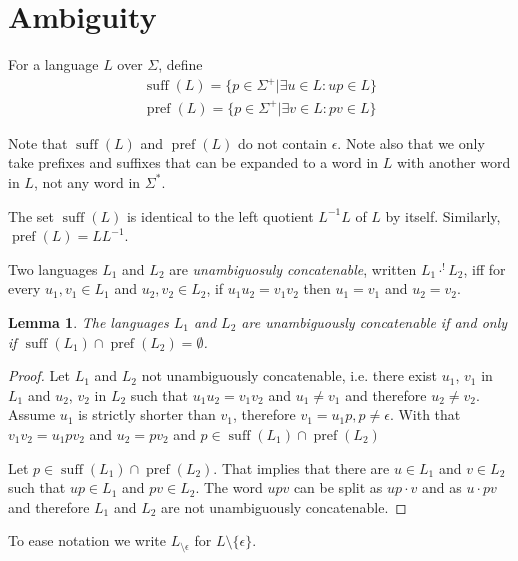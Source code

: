 \documentclass{amsart}
\newcommand{\ensmath}[1]{\ensuremath{#1}\xspace}
\newcommand{\suff}{\ensmath{\operatorname{suff}}}
\newcommand{\pref}{\ensmath{\operatorname{pref}}}
\newcommand{\eps}{\ensmath{\epsilon}}
\newcommand{\conc}[2]{\ensmath{#1\cdot #2}}
\newcommand{\uaconc}[2]{\ensmath{#1\cdot^{!} #2}}
\newcommand{\noeps}[1]{\ensmath{{#1}_{\setminus \epsilon}}}
\newtheorem{lemma}[theorem]{Lemma}
{\theoremstyle{definition} 
  \newtheorem{defn}{Definition}
  \newtheorem*{remark}{Remark}
  \newtheorem*{example}{Example}}
\begin{document}
\section*{Ambiguity}

\begin{defn}
  For a language $L$ over $\Sigma$, define
  \begin{equation*}
    \begin{split}
      \suff(L) = \{ p \in \Sigma^+ | \exists u \in L: up \in L \}\\
      \pref(L) = \{ p \in \Sigma^+ | \exists v \in L: pv \in L \}
    \end{split}
  \end{equation*}
\end{defn}
Note that $\suff(L)$ and $\pref(L)$ do not contain $\eps$. Note also that
we only take prefixes and suffixes that can be expanded to a word in $L$
with another word in $L$, not any word in $\Sigma^*$.

The set $\suff(L)$ is identical to the left quotient $L^{-1}L$ of $L$ by
itself. Similarly, $\pref(L) = LL^{-1}$.

\begin{defn}
Two languages $L_1$ and $L_2$ are \emph{unambiguosuly concatenable},
written \uaconc{L_1}{L_2}, iff for every $u_1, v_1 \in L_1$ and $u_2, v_2
\in L_2$, if $u_1u_2=v_1v_2$ then $u_1=v_1$ and $u_2=v_2$.
\end{defn}

\begin{lemma}
  The languages $L_1$ and $L_2$ are unambiguously concatenable if and only
  if $\suff(L_1) \cap \pref(L_2) = \emptyset$.
\end{lemma}
\begin{proof}
Let $L_1$ and $L_2$ not unambiguously concatenable, i.e. there exist $u_1$,
$v_1$ in $L_1$ and $u_2$, $v_2$ in $L_2$ such that $u_1u_2=v_1v_2$ and
$u_1\neq v_1$ and therefore $u_2 \neq v_2$. Assume $u_1$ is strictly
shorter than $v_1$, therefore $v_1 = u_1 p, p \neq \eps$. With that $v_1v_2
= u_1pv_2$ and $u_2 = pv_2$ and $p \in \suff(L_1) \cap \pref(L_2)$

Let $p \in \suff(L_1) \cap \pref(L_2)$. That implies that
there are $u\in L_1$ and $v\in L_2$ such that $up\in L_1$ and $pv\in
L_2$. The word $upv$ can be split as $\conc{up}{v}$ and as $\conc{u}{pv}$
and therefore $L_1$ and $L_2$ are not unambiguously concatenable.
\end{proof}

To ease notation we write $\noeps{L}$ for $L\setminus \{
\epsilon \}$.
\end{document}
